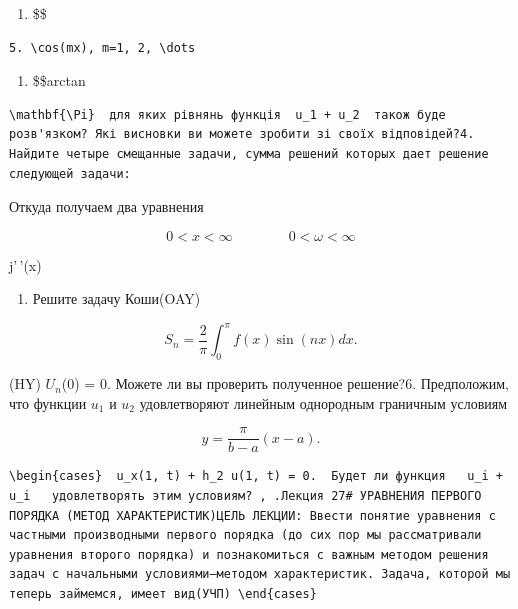 \documentclass[
  ukrainian,
]{article}
\providecommand{\tightlist}{%
  \setlength{\itemsep}{0pt}\setlength{\parskip}{0pt}}
\begin{document}
\begin{enumerate}
\def\labelenumi{\arabic{enumi}.}
\setcounter{enumi}{6}
\tightlist
\item
  \$\$
\end{enumerate}

\begin{verbatim}
5. \cos(mx), m=1, 2, \dots
\end{verbatim}

\begin{enumerate}
\def\labelenumi{\arabic{enumi}.}
\setcounter{enumi}{8}
\tightlist
\item
  \$\$arctan 
\end{enumerate}

\begin{verbatim}
\mathbf{\Pi}  для яких рівнянь функція  u_1 + u_2  також буде розв'язком? Які висновки ви можете зробити зі своїх відповідей?4. Найдите четыре смещанные задачи, сумма решений которых дает решение следующей задачи:
\end{verbatim}

Откуда получаем два уравнения

\[
0 < x < \infty \qquad \qquad 0 < \omega < \infty
\]

j'\,'(x)

\begin{enumerate}
\def\labelenumi{\arabic{enumi}.}
\setcounter{enumi}{4}
\tightlist
\item
  Решите задачу Коши(OAY)
\end{enumerate}

\[
S_n = \frac{2}{\pi} \int_0^{\pi} f(x) \sin(nx) dx.
\]

(HY) \(U_n\)(0) = 0. Можете ли вы проверить полученное решение?6.
Предположим, что функции \(u_1\) и \(u_2\) удовлетворяют линейным
однородным граничным условиям

\[
y = \frac{\pi}{b - a} (x - a).
\]

\begin{verbatim}
\begin{cases}  u_x(1, t) + h_2 u(1, t) = 0.  Будет ли функция   u_i + u_i   удовлетворять этим условиям? , .Лекция 27# УРАВНЕНИЯ ПЕРВОГО ПОРЯДКА (МЕТОД ХАРАКТЕРИСТИК)ЦЕЛЬ ЛЕКЦИИ: Ввести понятие уравнения с частными производными первого порядка (до сих пор мы рассматривали уравнения второго порядка) и познакомиться с важным методом решения задач с начальными условиями—методом характеристик. Задача, которой мы теперь займемся, имеет вид(УЧП) \end{cases}
\end{verbatim}
\end{document}
